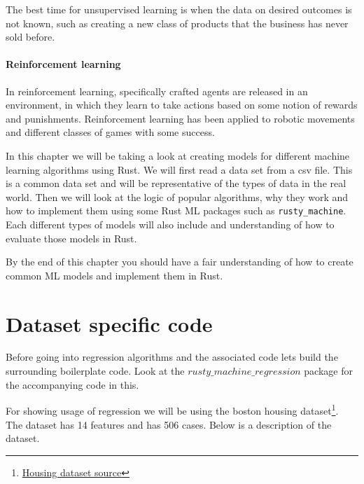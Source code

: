 \documentclass{book}
\begin{document}
The best time for unsupervised learning is when the data on desired outcomes is not known, such as creating a new class of products that the business has never sold before.
\label{par:unsupervised_learning}

\paragraph{Reinforcement learning}%
In reinforcement learning, specifically crafted agents are released in an environment, in which they learn to take actions based on some notion of rewards and punishments. Reinforcement learning has been applied to robotic movements and different classes of games with some success.
\label{par:reinforcement_learning}

In this chapter we will be taking a look at creating models for different machine learning algorithms using Rust. We will first read a data set from a csv file. This is a common data set and will be representative of the types of data in the real world. Then we will look at the logic of popular algorithms, why they work and how to implement them using some Rust ML packages such as \lstinline{rusty_machine}. Each different types of models will also include and understanding of how to evaluate those models in Rust.

By the end of this chapter you should have a fair understanding of how to create common ML models and implement them in Rust.

\label{sec:whatismachinelearning}

\section{Dataset specific code}%
Before going into regression algorithms and the associated code lets build the surrounding boilerplate code. Look at the $rusty\_machine\_regression$ package for the accompanying code in this.

For showing usage of regression we will be using the boston housing dataset\footnote{\href{https://www.cs.toronto.edu/~delve/data/boston/bostonDetail.html}{Housing dataset source}}. The dataset has 14 features and has 506 cases. Below is a description of the dataset.
\end{document}
